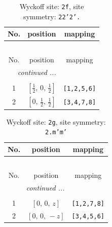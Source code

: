 \documentclass[fleqn,8pt]{jsarticle}
\begin{document}
\renewcommand{\arraystretch}{1.2}
\begin{longtable}{ccc}
\caption{Wyckoff site: {\tt 2f}, site symmetry: {\tt 22'2'.}}
 \\
 \hline \hline
No. & position & mapping \\ \hline \endfirsthead

\multicolumn{2}{l}{\tablename\ \thetable{}} \\
 \hline \hline
No. & position & mapping \\ \hline \endhead

 \hline \hline
\multicolumn{2}{r}{\footnotesize\it continued ...} \\ \endfoot

 \hline \hline
\multicolumn{2}{r}{} \\ \endlastfoot

1 & $\left[ \frac{1}{2},\, 0,\, \frac{1}{2} \right]$ & {\tt [1,2,5,6]} \\ \hline
2 & $\left[ 0,\, \frac{1}{2},\, \frac{1}{2} \right]$ & {\tt [3,4,7,8]} \\
\end{longtable}
\renewcommand{\arraystretch}{1.2}
\begin{longtable}{ccc}
\caption{Wyckoff site: {\tt 2g}, site symmetry: {\tt 2.m'm'}}
 \\
 \hline \hline
No. & position & mapping \\ \hline \endfirsthead

\multicolumn{2}{l}{\tablename\ \thetable{}} \\
 \hline \hline
No. & position & mapping \\ \hline \endhead

 \hline \hline
\multicolumn{2}{r}{\footnotesize\it continued ...} \\ \endfoot

 \hline \hline
\multicolumn{2}{r}{} \\ \endlastfoot

1 & $\left[ 0,\, 0,\, z \right]$ & {\tt [1,2,7,8]} \\ \hline
2 & $\left[ 0,\, 0,\, - z \right]$ & {\tt [3,4,5,6]} \\
\end{longtable}
\renewcommand{\arraystretch}{1.2}
\end{document}
